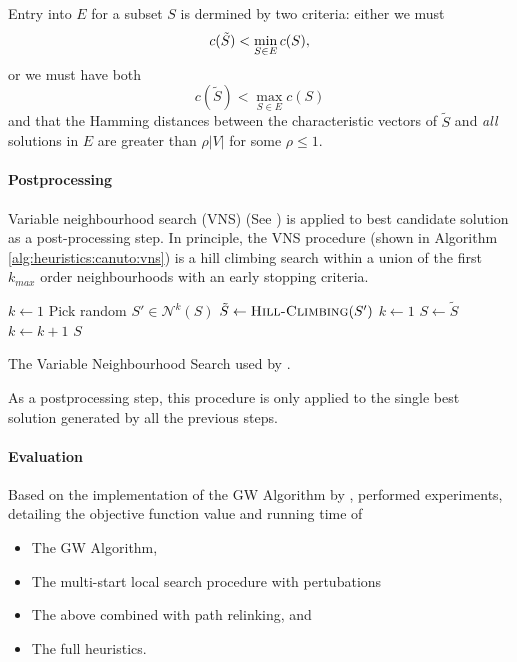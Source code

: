  Entry into $E$ for a subset $S$ is dermined by two criteria:
 either we must
 $$c(\tilde{S}) < \min_{S \in E} c(S)\mathnormal{,}$$
 or we must have both
 $$c(\tilde{S}) < \max_{S \in E} c(S)$$
  and that the Hamming distances between the characteristic vectors of $\tilde{S}$
   and \textit{all} solutions in $E$ are greater than $\rho |V|$ for some $\rho \leq 1$. 

\paragraph{Postprocessing}
Variable neighbourhood search (VNS) (See \citet{hansen2010variable}) is applied
to best candidate solution as a post-processing step. In principle, the VNS
procedure (shown in Algorithm \ref{alg:heuristics:canuto:vns}) is a hill climbing
search within a union of the first $k_{max}$ order neighbourhoods with an early stopping
 criteria.
\begin{algorithm}[h!]
   \begin{algorithmic}[1]
     \State $k \gets 1$
     \State Pick random $S' \in \mathcal{N}^k(S)$
     \State $\tilde{S} \gets \Call{Hill-Climbing}{S'}$
     \State $k \gets 1$
     \State $S \gets \tilde{S}$
     \Else
     \State $k \gets k + 1$
     \EndIf
     \EndWhile
     \EndFor
     \State \Return $S$
     \EndProcedure
 \end{algorithmic}
 \caption{The Variable Neighbourhood Search
   used by \citet{canuto2001local}.}\label{alg:heuristics:canuto:vns}
 \end{algorithm}

 As a postprocessing step, this procedure is only applied to the single best solution generated
  by all the previous steps.
\paragraph{Evaluation}
Based on the implementation of the GW Algorithm by \citet{Johnson:2000:PCS:338219.338637},
\citet{canuto2001local} performed experiments, detailing the objective function value
and running time of
\begin{itemize}
\item The GW Algorithm,
\item The multi-start local search procedure with pertubations
\item The above combined with path relinking, and
\item The full heuristics.
\end{itemize}

